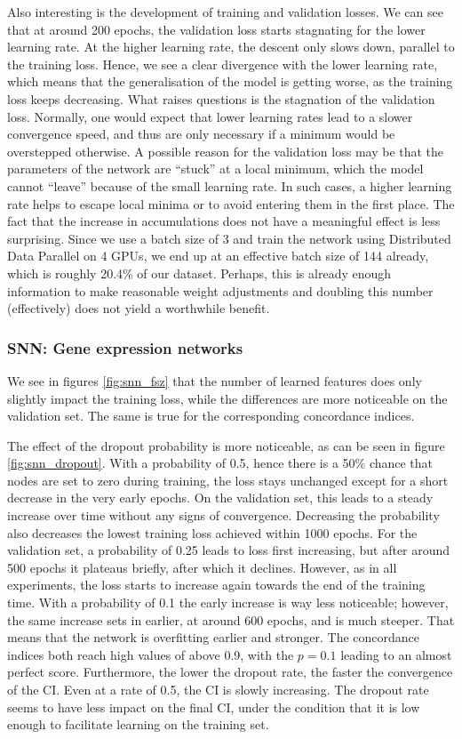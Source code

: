 Also interesting is the development of training and validation losses. We can see that at around 200 epochs, the validation loss starts stagnating for the lower learning rate. At the higher learning rate, the descent only slows down, parallel to the training loss. Hence, we see a clear divergence with the lower learning rate, which means that the generalisation of the model is getting worse, as the training loss keeps decreasing. 
What raises questions is the stagnation of the validation loss. Normally, one would expect that lower learning rates lead to a slower convergence speed, and thus are only necessary if a minimum would be overstepped otherwise. A possible reason for the validation loss may be that the parameters of the network are “stuck” at a local minimum, which the model cannot “leave” because of the small learning rate. In such cases, a higher learning rate helps to escape local minima or to avoid entering them in the first place.
The fact that the increase in accumulations does not have a meaningful effect is less surprising. Since we use a batch size of 3 and train the network using Distributed Data Parallel on 4 GPUs, we end up at an effective batch size of 144 already, which is roughly 20.4\% of our dataset. Perhaps, this is already enough information to make reasonable weight adjustments and doubling this number (effectively) does not yield a worthwhile benefit.

\subsubsection{SNN: Gene expression networks}

We see in figures \ref{fig:snn_fsz} that the number of learned features does only slightly impact the training loss, while the differences are more noticeable on the validation set. The same is true for the corresponding concordance indices. 

The effect of the dropout probability is more noticeable, as can be seen in figure \ref{fig:snn_dropout}. With a probability of 0.5, hence there is a 50\% chance that nodes are set to zero during training, the loss stays unchanged except for a short decrease in the very early epochs. On the validation set, this leads to a steady increase over time without any signs of convergence. Decreasing the probability also decreases the lowest training loss achieved within 1000 epochs. For the validation set, a probability of 0.25 leads to loss first increasing, but after around 500 epochs it plateaus briefly, after which it declines. However, as in all experiments, the loss starts to increase again towards the end of the training time. With a probability of 0.1 the early increase is way less noticeable; however, the same increase sets in earlier, at around 600 epochs, and is much steeper. That means that the network is overfitting earlier and stronger.
The concordance indices both reach high values of above 0.9, with the \(p=0.1\) leading to an almost perfect score. Furthermore, the lower the dropout rate, the faster the convergence of the CI. Even at a rate of 0.5, the CI is slowly increasing. The dropout rate seems to have less impact on the final CI, under the condition that it is low enough to facilitate learning on the training set.

